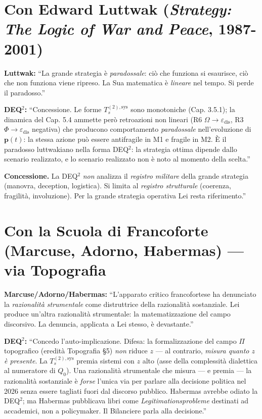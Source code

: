 \section{\texorpdfstring{Con Edward Luttwak (\emph{Strategy: The Logic
of War and Peace},
1987-2001)}{Con Edward Luttwak (Strategy: The Logic of War and Peace, 1987-2001)}}\label{con-edward-luttwak-strategy-the-logic-of-war-and-peace-1987-2001}

\textbf{Luttwak:} ``La grande strategia è \emph{paradossale}: ciò che
funziona si esaurisce, ciò che non funziona viene ripreso. La Sua
matematica è \emph{lineare} nel tempo. Si perde il paradosso.''

\textbf{DEQ$^2$:} ``Concessione. Le forme \(T_s^{(2),\text{sys}}\) sono
monotoniche (Cap. 3.5.1); la dinamica del Cap. 5.4 ammette però
retroazioni non lineari (R6 \(\Omega \to \varepsilon_{\text{dis}}\), R3
\(\Phi \to \varepsilon_{\text{dis}}\) negativa) che producono
comportamento \emph{paradossale} nell'evoluzione di
\(\boldsymbol{p}(t)\): la stessa azione può essere antifragile in M1 e
fragile in M2. È il paradosso luttwakiano nella forma DEQ$^2$: la strategia
ottima dipende dallo scenario realizzato, e lo scenario realizzato non è
noto al momento della scelta.''

\textbf{Concessione.} La DEQ$^2$ \emph{non} analizza il \emph{registro
militare} della grande strategia (manovra, deception, logistica). Si
limita al \emph{registro strutturale} (coerenza, fragilità,
involuzione). Per la grande strategia operativa Lei resta riferimento.''



\section{Con la Scuola di Francoforte (Marcuse, Adorno, Habermas) ---
via
Topografia}\label{con-la-scuola-di-francoforte-marcuse-adorno-habermas-via-topografia}

\textbf{Marcuse/Adorno/Habermas:} ``L'apparato critico francofortese ha
denunciato la \emph{razionalità strumentale} come distruttrice della
razionalità sostanziale. Lei produce un'altra razionalità strumentale:
la matematizzazione del campo discorsivo. La denuncia, applicata a Lei
stesso, è devastante.''

\textbf{DEQ$^2$:} ``Concedo l'auto-implicazione. Difesa: la formalizzazione
del campo \(\Pi\) topografico (eredità Topografia \S{}5) \emph{non} riduce
\(z\) --- al contrario, \emph{misura quanto \(z\) è presente}. La
\(T_s^{(2),\text{sys}}\) premia sistemi con \(z\) alto (asse della
complessità dialettica al numeratore di \(Q_0\)). Una razionalità
strumentale che misura --- e premia --- la razionalità sostanziale è
\emph{forse} l'unica via per parlare alla decisione politica nel 2026
senza essere tagliati fuori dal discorso pubblico. Habermas avrebbe
odiato la DEQ$^2$; ma Habermas pubblicava libri come
\emph{Legitimationsprobleme} destinati ad accademici, non a policymaker.
Il Bilanciere parla alla decisione.''

